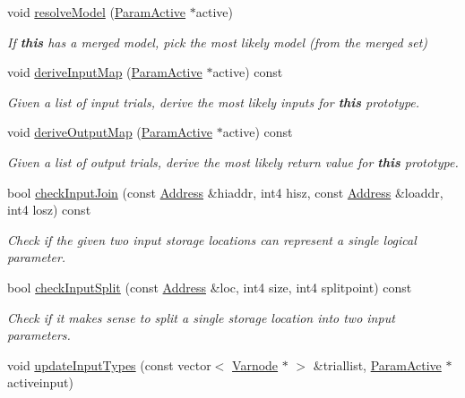 \begin{DoxyCompactItemize}
void \mbox{\hyperlink{class_func_proto_afd3b71963b55dd19755eeaccd016c4bf}{resolve\+Model}} (\mbox{\hyperlink{class_param_active}{Param\+Active}} $\ast$active)
\begin{DoxyCompactList}\small\item\em If {\bfseries{this}} has a {\itshape merged} model, pick the most likely model (from the merged set) \end{DoxyCompactList}\item 
void \mbox{\hyperlink{class_func_proto_a06ef0c088573715372df24ef978bd610}{derive\+Input\+Map}} (\mbox{\hyperlink{class_param_active}{Param\+Active}} $\ast$active) const
\begin{DoxyCompactList}\small\item\em Given a list of input {\itshape trials}, derive the most likely inputs for {\bfseries{this}} prototype. \end{DoxyCompactList}\item 
void \mbox{\hyperlink{class_func_proto_a750224dcda509d76d01e3f45a3d38117}{derive\+Output\+Map}} (\mbox{\hyperlink{class_param_active}{Param\+Active}} $\ast$active) const
\begin{DoxyCompactList}\small\item\em Given a list of output {\itshape trials}, derive the most likely return value for {\bfseries{this}} prototype. \end{DoxyCompactList}\item 
bool \mbox{\hyperlink{class_func_proto_a961837591bf1445a8db9d7604c1e5046}{check\+Input\+Join}} (const \mbox{\hyperlink{class_address}{Address}} \&hiaddr, int4 hisz, const \mbox{\hyperlink{class_address}{Address}} \&loaddr, int4 losz) const
\begin{DoxyCompactList}\small\item\em Check if the given two input storage locations can represent a single logical parameter. \end{DoxyCompactList}\item 
bool \mbox{\hyperlink{class_func_proto_a768d557c966fc2f59c8ae0f09777b4fe}{check\+Input\+Split}} (const \mbox{\hyperlink{class_address}{Address}} \&loc, int4 size, int4 splitpoint) const
\begin{DoxyCompactList}\small\item\em Check if it makes sense to split a single storage location into two input parameters. \end{DoxyCompactList}\item 
void \mbox{\hyperlink{class_func_proto_acb98890f848bc9e267c62c30e58a7f5f}{update\+Input\+Types}} (const vector$<$ \mbox{\hyperlink{class_varnode}{Varnode}} $\ast$ $>$ \&triallist, \mbox{\hyperlink{class_param_active}{Param\+Active}} $\ast$activeinput)

\end{DoxyCompactItemize}
